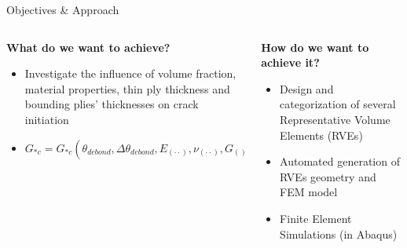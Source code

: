 \documentclass[final]{beamer}
\begin{document}
\begin{frame}
\begin{center}
	\begin{minipage}{\textwidth}
		\begin{alertblock}{\rule[-0.6ex]{0pt}{50pt}\centering\LARGE Objectives \& Approach}
			\begin{columns}
				\begin{column}{0.475\textwidth}
   					 \begin{center}
						\textbf{What do we want to achieve?}\\[5pt]
							\begin{itemize}
    								\item Investigate the influence of volume fraction, material properties, thin ply thickness and bounding plies' thicknesses on crack initiation\\[10pt]
    								\item $G_{*c}=G_{*c}\left(\theta_{debond},\Delta\theta_{debond}, E_{\left(\cdot\cdot\right)}, \nu_{\left(\cdot\cdot\right)}, G_{\left(\right)},VF_{f}, t_{ply}, \frac{t_{ply}}{t_{bounding\ plies}}\right)$
							\end{itemize}
   					\end{center}
				\end{column}
				\begin{column}{0.475\textwidth}  %
   					\begin{center}
						\textbf{How do we want to achieve it?}\\[5pt]
						\begin{itemize}
    							\item Design and categorization of several Representative Volume Elements (RVEs)
    							\item Automated generation of RVEs geometry and FEM model
    							\item Finite Element Simulations (in Abaqus)
						\end{itemize}
   					\end{center}
				\end{column}
			\end{columns}
		\end{alertblock}
	\end{minipage}
\end{center}




\end{frame}
\end{document}
